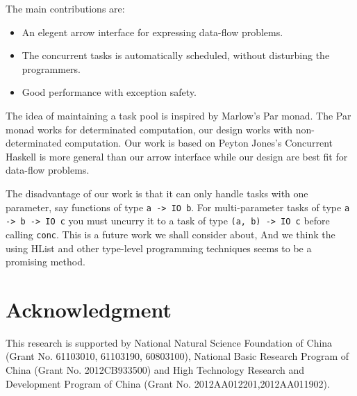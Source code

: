 \documentclass[conference]{IEEEtran}
\begin{document}
The main contributions are:
\begin{itemize}
  \item An elegent arrow interface for expressing data-flow problems.
  \item The concurrent tasks is automatically scheduled, without disturbing the programmers.
  \item Good performance with exception safety.
\end{itemize}

The idea of maintaining a task pool is inspired by Marlow's Par monad.\cite{Marlow2011a}
The Par monad works for
determinated computation, our design works with non-determinated computation.
Our work is based on Peyton Jones's Concurrent Haskell\cite{Jones1996} 
is more general than our arrow interface while our design are best fit for data-flow problems.

The disadvantage of our work is that it can only handle tasks with one parameter, say functions of
type \texttt{a -> IO b}. For multi-parameter tasks of type \texttt{a -> b -> IO c} you must uncurry
it to a task of type \texttt{(a, b) -> IO c} before calling \texttt{conc}. This is a future work
we shall consider about, And we think the using HList\cite{Kiselyov2004} and other
type-level programming techniques seems to be a promising method.



\section*{Acknowledgment}
This research is supported by National Natural Science Foundation of China
(Grant No. 61103010, 61103190, 60803100), National Basic Research Program
of China (Grant No. 2012CB933500) and High Technology Research and Development
Program of China (Grant No. 2012AA012201,2012AA011902).



%
%
%






\end{document}
